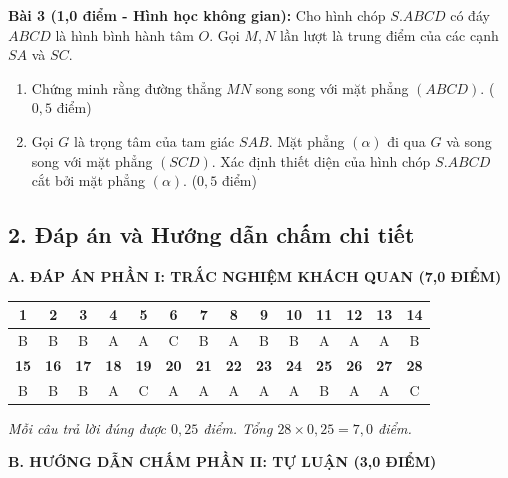 \documentclass[12pt, a4paper]{article}
\begin{document}
\noindent \textbf{Bài 3 (1,0 điểm - Hình học không gian):}
Cho hình chóp $S.ABCD$ có đáy $ABCD$ là hình bình hành tâm $O$. Gọi $M, N$ lần lượt là trung điểm của các cạnh $SA$ và $SC$.
\begin{enumerate}[leftmargin=0.6cm]
    \item[a)] Chứng minh rằng đường thẳng $MN$ song song với mặt phẳng $(ABCD)$. ($0{,}5$ điểm)
    \item[b)] Gọi $G$ là trọng tâm của tam giác $SAB$. Mặt phẳng $(\alpha)$ đi qua $G$ và song song với mặt phẳng $(SCD)$. Xác định thiết diện của hình chóp $S.ABCD$ cắt bởi mặt phẳng $(\alpha)$. ($0{,}5$ điểm)
\end{enumerate}

\subsection*{2. Đáp án và Hướng dẫn chấm chi tiết}

\noindent \textbf{A. ĐÁP ÁN PHẦN I: TRẮC NGHIỆM KHÁCH QUAN (7,0 ĐIỂM)}
\begin{center}
\renewcommand{\arraystretch}{1.2}
\begin{tabular}{|c|c|c|c|c|c|c|c|c|c|c|c|c|c|}
    \hline
    \textbf{1} & \textbf{2} & \textbf{3} & \textbf{4} & \textbf{5} & \textbf{6} & \textbf{7} & \textbf{8} & \textbf{9} & \textbf{10} & \textbf{11} & \textbf{12} & \textbf{13} & \textbf{14} \\ \hline
    B & B & B & A & A & C & B & A & B & B & A & A & A & B \\ \hline
    \textbf{15} & \textbf{16} & \textbf{17} & \textbf{18} & \textbf{19} & \textbf{20} & \textbf{21} & \textbf{22} & \textbf{23} & \textbf{24} & \textbf{25} & \textbf{26} & \textbf{27} & \textbf{28} \\ \hline
    B & B & B & A & C & A & A & A & A & A & B & A & A & C \\ \hline
\end{tabular}
\end{center}
\textit{Mỗi câu trả lời đúng được $0{,}25$ điểm. Tổng $28 \times 0{,}25 = 7{,}0$ điểm.}

\vspace{5pt}
\noindent \textbf{B. HƯỚNG DẪN CHẤM PHẦN II: TỰ LUẬN (3,0 ĐIỂM)}
\end{document}
